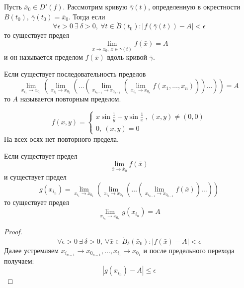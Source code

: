 \begin{definition}
    Пусть $\bar{x}_0\in D'(f)$. Рассмотрим кривую $\bar{\gamma}(t)$, определенную в окрестности $B(t_0),\ \bar{\gamma}(t_0)=\bar{x}_0$. Тогда если 
    \[\forall \epsilon>0\ \exists\ \delta>0,\ \forall t\in \mathring{B}(t_0): |f(\bar{\gamma}(t))-A|<\epsilon\]
    то существует предел 
    \[\lim\limits_{\bar{x}\to \bar{x}_0,\ \bar{x}\in \bar{\gamma}(t)}f(\bar{x})=A\]
    и он называется пределом $f(\bar{x})$ вдоль кривой $\bar{\gamma}$.
\end{definition} 
\begin{definition}
    Если существует последовательность пределов
    \[\lim\limits_{x_{i_1}\to x_{0_1}}(\lim\limits_{x_{i_2}\to x_{0_2}}(\dots(\lim\limits_{x_{i_{n-1}}\to x_{0_{n-1}}}(\lim\limits_{x_{i_n}\to x_{0_n}}f(x_1,\dots,x_n)))\dots))=A\]
    то $A$ называется повторным пределом. 
\end{definition} 
\begin{example}
    \[f(x,y)=\begin{cases}
        x\sin{\frac{1}{y}+y\sin{\frac{1}{x}}}\ ,\ (x,y)\ne (0,0)\\
        0,\ (x, y)=0
    \end{cases}
    \]
    На всех осях нет повторного предела.
\end{example}
\begin{theorem}
    Если существует предел
    \[\lim\limits_{\bar{x}\to \bar{x}_0}f(\bar{x})\]
    и существует предел
    \[g(x_{i_n})=\lim\limits_{x_{i_1}\to x_{0_1}}(\lim\limits_{x_{i_2}\to x_{0_2}}(\dots(\lim\limits_{x_{i_{n-1}}\to x_{0_{n-1}}}f(\bar{x}))\dots))\]
    то существует предел
    \[\lim\limits_{x_{i_n}\to x_{0_n}}g(x_{i_n})=A\]
\end{theorem} 
\begin{proof}
    \[\forall \epsilon>0\ \exists\ \delta>0,\ \forall \bar{x}\in \mathring{B}_{\delta}(\bar{x}_0): |f(\bar{x})-A|<\epsilon\]
    Далее устремляем $x_{i_{n-1}}\to x_{0_{n-1}}, \dots, x_{i_1}\to x_{0_1}$ и после предельного перехода получаем:
    \[|g(x_{i_n})-A|\leq \epsilon\]
\end{proof} 
